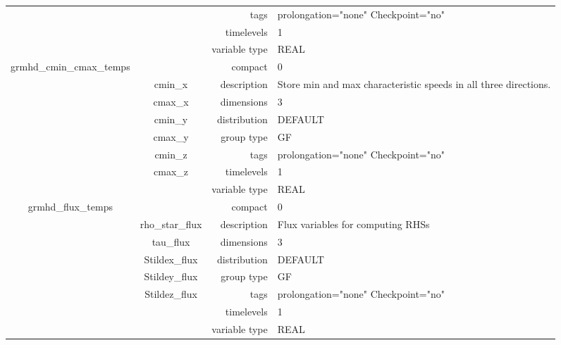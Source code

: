 \documentclass{article}
\begin{document}
\begin{tabular*}{150mm}{|c|c@{\extracolsep{\fill}}|rl|}
 &  & tags & prolongation="none" Checkpoint="no" \\ 
 &  & timelevels & 1 \\ 
 &  & variable type & REAL \\ 
\hline 
grmhd\_cmin\_cmax\_temps &  & compact & 0 \\ 
 & cmin\_x & description & Store min and max characteristic speeds in all three directions. \\ 
 & cmax\_x & dimensions & 3 \\ 
 & cmin\_y & distribution & DEFAULT \\ 
 & cmax\_y & group type & GF \\ 
 & cmin\_z & tags & prolongation="none" Checkpoint="no" \\ 
 & cmax\_z & timelevels & 1 \\ 
 &  & variable type & REAL \\ 
\hline 
grmhd\_flux\_temps &  & compact & 0 \\ 
 & rho\_star\_flux & description & Flux variables for computing RHSs \\ 
 & tau\_flux & dimensions & 3 \\ 
 & Stildex\_flux & distribution & DEFAULT \\ 
 & Stildey\_flux & group type & GF \\ 
 & Stildez\_flux & tags & prolongation="none" Checkpoint="no" \\ 
 &  & timelevels & 1 \\ 
 &  & variable type & REAL \\ 
\hline 
\end{tabular*} 



\vspace{5mm}
\vspace{5mm}
\end{document}
